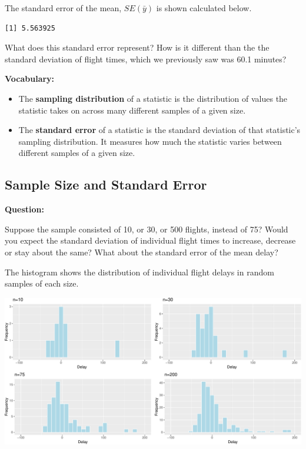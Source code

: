 \documentclass[
  letterpaper,
  DIV=11,
  numbers=noendperiod]{scrreprt}
\newenvironment{Shaded}{\begin{snugshade}}{\end{snugshade}}
\newcommand{\FunctionTok}[1]{\textcolor[rgb]{0.28,0.35,0.67}{#1}}
\newcommand{\NormalTok}[1]{\textcolor[rgb]{0.00,0.23,0.31}{#1}}
\newcommand{\OtherTok}[1]{\textcolor[rgb]{0.00,0.23,0.31}{#1}}
\newcommand{\SpecialCharTok}[1]{\textcolor[rgb]{0.37,0.37,0.37}{#1}}
\providecommand{\tightlist}{%
  \setlength{\itemsep}{0pt}\setlength{\parskip}{0pt}}\usepackage{longtable,booktabs,array}
\begin{document}
The standard error of the mean, \(SE(\bar{y})\) is shown calculated
below.

\begin{Shaded}
\end{Shaded}

\begin{verbatim}
[1] 5.563925
\end{verbatim}

What does this standard error represent? How is it different than the
the standard deviation of flight times, which we previously saw was 60.1
minutes?

\textbf{Vocabulary:}

\begin{itemize}
\tightlist
\item
  The \textbf{sampling distribution} of a statistic is the distribution
  of values the statistic takes on across many different samples of a
  given size.\\
\item
  The \textbf{standard error} of a statistic is the standard deviation
  of that statistic's sampling distribution. It measures how much the
  statistic varies between different samples of a given size.
\end{itemize}

\subsection{Sample Size and Standard
Error}\label{sample-size-and-standard-error}

\textbf{Question:}

Suppose the sample consisted of 10, or 30, or 500 flights, instead of
75? Would you expect the standard deviation of individual flight times
to increase, decrease or stay about the same? What about the standard
error of the mean delay?

The histogram shows the distribution of individual flight delays in
random samples of each size.

\includegraphics{Ch3_files/figure-pdf/unnamed-chunk-26-1.pdf}
\end{document}
